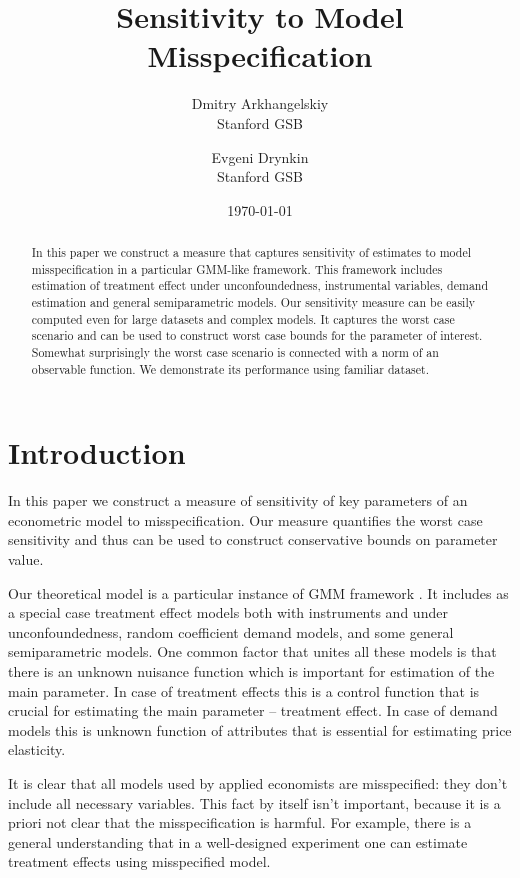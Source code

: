 \documentclass[12pt]{article}
\title{Sensitivity to Model Misspecification}
\date{\today}
\author{Dmitry Arkhangelskiy \\ Stanford GSB  \and  Evgeni Drynkin \\ Stanford GSB}
\theoremstyle{plain}
\begin{document}
\maketitle

\begin{abstract}
In this paper we construct a measure that captures sensitivity of estimates to model misspecification in a particular GMM-like framework. This framework includes estimation of treatment effect under unconfoundedness, instrumental variables, demand estimation and general semiparametric models. Our sensitivity measure can be easily computed even for large datasets and complex models. It captures the worst case scenario and can be used to construct worst case bounds for the parameter of interest. Somewhat surprisingly the worst case scenario is connected with a norm of an observable function. We demonstrate its performance using familiar \parencite{lalonde1986evaluating} dataset. 
\end{abstract}


\section{Introduction}

In this paper we construct a measure of sensitivity of key parameters of an econometric model to misspecification. Our measure quantifies the worst case sensitivity and thus can be used to construct conservative bounds on parameter value. 

Our theoretical model is a particular instance of GMM framework \parencite[see][]{hansen1982large}. It includes as a special case treatment effect models both with instruments and under unconfoundedness, random coefficient demand models, and some general semiparametric models. One common factor that unites all these models is that there is an unknown nuisance function which is important for estimation of the main parameter. In case of treatment effects this is a control function that is crucial for estimating the main parameter -- treatment effect. In case of demand models this is unknown function of attributes that is essential for estimating price elasticity. 

It is clear that all models used by applied economists are misspecified: they don't include all necessary variables. This fact by itself isn't important, because it is a priori not clear that the misspecification is harmful. For example, there is a general understanding that in a well-designed experiment one can estimate treatment effects using misspecified model.
 
\end{document}
